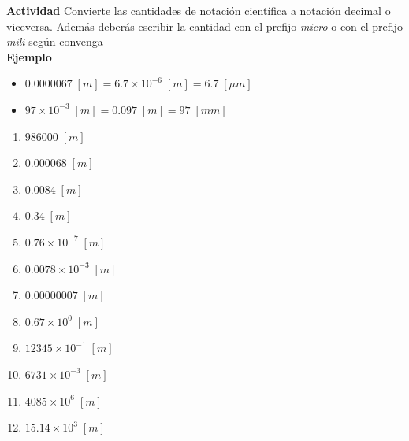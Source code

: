 \documentclass[11pt]{article}
\theoremstyle{definition}
\begin{document}

\begin{myblock}{\textbf{Actividad }}
	Convierte las cantidades de notación científica a notación decimal o viceversa. Además deberás escribir la cantidad con el prefijo \textit{micro} o con el prefijo \textit{mili} según convenga\\[1cm]
	\textbf{Ejemplo}
	\begin{itemize}
		\item $0.0000067 \;[m] = 6.7 \times 10^{-6} \;[m] = 6.7 \;[\mu m]$
		\item $97 \times 10^{-3} \;[m] = 0.097 \;[m] = 97 \;[mm] $
	\end{itemize}

	
    
    \begin{multicols}{2} 
        \begin{enumerate}
            \item $986000 \;[m] $
            \item $0.000068 \;[m] $
            \item $0.0084 \;[m] $
            \item $0.34 \;[m] $
            \item $0.76 \times 10^{-7} \;[m] $
            \item $0.0078 \times 10^{-3} \;[m] $
            \item $0.00000007 \;[m] $
            \item $0.67 \times 10^{0}\;[m] $
            \item $12345 \times 10^{-1} \;[m] $
            \item $6731 \times 10^{-3}\;[m] $
            \item $4085 \times 10^{6} \;[m] $
            \item $15.14 \times 10^{3}\;[m] $
        \end{enumerate}
    \end{multicols}
\end{myblock}
\end{document}
